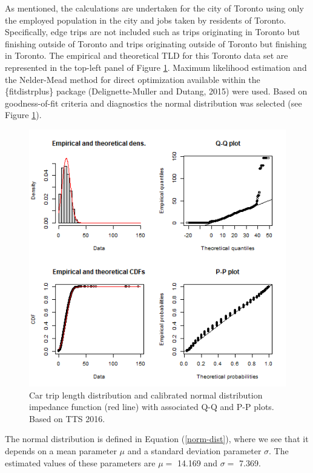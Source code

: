 \documentclass[]{elsarticle} %
\begin{document}
As mentioned, the calculations are undertaken for the city of Toronto
using only the employed population in the city and jobs taken by
residents of Toronto. Specifically, edge trips are not included such as
trips originating in Toronto but finishing outside of Toronto and trips
originating outside of Toronto but finishing in Toronto. The empirical
and theoretical TLD for this Toronto data set are represented in the
top-left panel of Figure \ref{fig:TLD-norm-plot}. Maximum likelihood
estimation and the Nelder-Mead method for direct optimization available
within the \{fitdistrplus\} package (Delignette-Muller and Dutang, 2015)
were used. Based on goodness-of-fit criteria and diagnostics the normal
distribution was selected (see Figure \ref{fig:TLD-norm-plot}).

\begin{figure}

{\centering \includegraphics[width=1\linewidth]{images/impedance_function} 

}

\caption{\label{fig:TLD-norm-plot}Car trip length distribution and calibrated normal distribution impedance function (red line) with associated Q-Q and P-P plots. Based on TTS 2016.}\label{fig:TLD-norm-plot}
\end{figure}

The normal distribution is defined in Equation (\ref{norm-dist}), where
we see that it depends on a mean parameter \(\mu\) and a standard
deviation parameter \(\sigma\). The estimated values of these parameters
are \(\mu=\) 14.169 and \(\sigma =\) 7.369.
\end{document}
